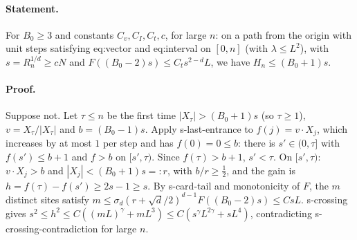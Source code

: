 \paragraph{Statement.} For $B_0\geq3$ and constants $C_v,C_I,C_t,c$, for large $n$: on a path from the origin with unit steps satisfying eq:vector and eq:interval on
$[0,n]$ (with $\lambda\leq L^2$), with $s=R_n^{1/d}\geq cN$ and $F((B_0-2)s)\leq C_ts^{2-d}L$, we have $H_n\leq(B_0+1)s$.
\paragraph{Proof.} Suppose not. Let $\tau\leq n$ be the first time $|X_\tau|>(B_0+1)s$ (so $\tau\geq1$), $v=X_\tau/|X_\tau|$ and $b=(B_0-1)s$. Apply s-last-entrance to
$f(j)=v\cdot X_j$, which increases by at most $1$ per step and has $f(0)=0\leq b$: there is $s'\in(0,\tau]$ with $f(s')\leq b+1$ and $f>b$ on $[s',\tau)$. Since
$f(\tau)>b+1$, $s'<\tau$. On $[s',\tau)$: $v\cdot X_j>b$ and $|X_j|<(B_0+1)s=:r$, with $b/r\geq\frac12$, and the gain is $h=f(\tau)-f(s')\geq2s-1\geq s$. By s-card-tail and
monotonicity of $F$, the $m$ distinct sites satisfy $m\leq\sigma_d(r+\sqrt d/2)^{d-1}F((B_0-2)s)\leq CsL$. s-crossing gives
$s^2\leq h^2\leq C((mL)^\gamma+mL^3)\leq C(s^\gamma L^{2\gamma}+sL^4)$, contradicting s-crossing-contradiction for large $n$.
